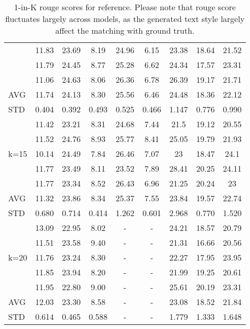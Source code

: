 \begin{table*}[t]
{\begin{tabular}{l|ccccc|ccc}
&11.83&	23.69&	8.19&	24.96&	6.15&	23.38&	18.64&	21.52\\
&11.79&	24.45&	8.77&	25.28&	6.62&	24.34&	17.57&	23.31\\
&11.06&	24.63&	8.06&	26.36&	6.78&	26.39&	19.17&	21.71\\
\midrule
AVG&11.74&	24.13&	8.30&	25.56&	6.46&	24.48&	18.36&	22.12\\
STD&0.404&	0.392&	0.493&	0.525&	0.466&	1.147&	0.776&	0.990\\
\midrule
\multirow{5}{*}{k=15}&11.42&	23.21&	8.31&	24.68&	7.44&	21.5&	19.12&	20.55\\
&11.52&	24.76&	8.93&	25.77&	8.41&	25.05&	19.79&	21.93\\
&10.14&	24.49&	7.84&	26.46&	7.07&	23&	18.47&	24.1\\
&11.77&	23.49&	8.11&	23.52&	7.89&	28.41&	20.25&	24.11\\
&11.77&	23.34&	8.52&	26.43&	6.96&	21.25&	20.24&	23\\
\midrule
AVG&11.32&	23.86&	8.34&	25.37&	7.55&	23.84&	19.57&	22.74\\
STD&0.680&	0.714&	0.414&	1.262&	0.601&	2.968&	0.770&	1.520\\
\midrule
\multirow{5}{*}{k=20}&13.09&	22.95&	8.02&	-&	-&	24.21&	18.57&	20.79\\
&11.51&	23.58&	9.40&	-&	-&	21.31&	16.66&	20.56\\
&11.76&	23.24&	8.30&	-&	-&	22.27&	17.95&	23.95\\
&11.85&	23.94&	8.20&	-&	-&	21.99&	19.25&	20.61\\
&11.95&	22.80&	9.00&	-&	-&	25.61&	20.19&	23.31\\
\midrule
AVG&12.03&	23.30&	8.58&	-&	-&	23.08&	18.52&	21.84\\
STD&0.614&	0.465&	0.588&	-&	-&	1.779&	1.333&	1.648\\
\bottomrule
    \end{tabular}}
    \caption{1-in-K rouge scores for reference. Please note that rouge score fluctuates largely across models, as the generated text style largely affect the matching with ground truth.}
    \label{tab:1ink_rouge}
\end{table*}